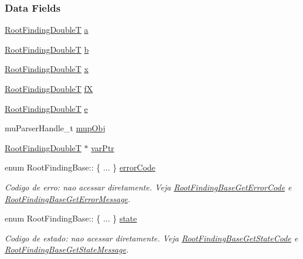 \subsubsection*{Data Fields}
\begin{CompactItemize}
\item 
\hyperlink{RootFindingCommon_8h_a296fe63994e03408c4ad62794d472e9}{RootFindingDoubleT} \hyperlink{structRootFindingBase_f00e92335d8038772634fe2ecd4d9a5a}{a}
\item 
\hyperlink{RootFindingCommon_8h_a296fe63994e03408c4ad62794d472e9}{RootFindingDoubleT} \hyperlink{structRootFindingBase_c93fa64c78603a4d15443dfe470d7ff7}{b}
\item 
\hyperlink{RootFindingCommon_8h_a296fe63994e03408c4ad62794d472e9}{RootFindingDoubleT} \hyperlink{structRootFindingBase_0397226e2f7f9f37462275742ec280a3}{x}
\item 
\hyperlink{RootFindingCommon_8h_a296fe63994e03408c4ad62794d472e9}{RootFindingDoubleT} \hyperlink{structRootFindingBase_220ad9f8e9d2424d8885675caf38e4da}{fX}
\item 
\hyperlink{RootFindingCommon_8h_a296fe63994e03408c4ad62794d472e9}{RootFindingDoubleT} \hyperlink{structRootFindingBase_5a4a111c9250303d6eb8dc8d29f7c00f}{e}
\item 
muParserHandle\_\-t \hyperlink{structRootFindingBase_e77677949a256721d17168efa25e3849}{mupObj}
\item 
\hyperlink{RootFindingCommon_8h_a296fe63994e03408c4ad62794d472e9}{RootFindingDoubleT} $\ast$ \hyperlink{structRootFindingBase_148f62857539ad7baada5c292782aabf}{varPtr}
\item 
enum RootFindingBase:: \{ ... \}  \hyperlink{structRootFindingBase_13f6ee23dba551f211ec37015f58c402}{errorCode}
\begin{CompactList}\small\item\em Codigo de erro: nao acessar diretamente. Veja \hyperlink{group____roots_gbcf354e731e02c63652af3a2058e739d}{RootFindingBaseGetErrorCode} e \hyperlink{group____roots_gcc5a0a8948e4b02a878f8d534c0bc982}{RootFindingBaseGetErrorMessage}. \item\end{CompactList}\item 
enum RootFindingBase:: \{ ... \}  \hyperlink{structRootFindingBase_96362edd623556cf5a0e873c03f72086}{state}
\begin{CompactList}\small\item\em Codigo de estado: nao acessar diretamente. Veja \hyperlink{group____roots_g1712b9a29b6e6b15df2195319d5f5d70}{RootFindingBaseGetStateCode} e \hyperlink{group____roots_ga2434bfeb9592ff54df8601cd1a9a04d}{RootFindingBaseGetStateMessage}. \item\end{CompactList}\end{CompactItemize}


